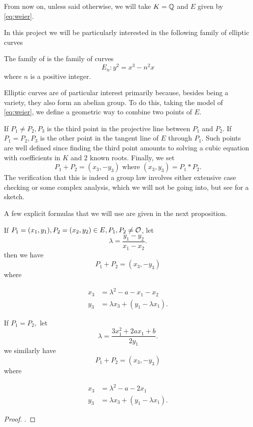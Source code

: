 \documentclass[12pt, a4paper]{amsart}
\begin{document}
From now on, unless said otherwise, we will take $K = {\mathbb Q}$ and $E$ given
by \autoref{eq:weier}.

In this project we will be particularly interested in the following family
of elliptic curves

\begin{defn}
  The family of  is the family of curves
  \begin{equation} \label{eq:twist}
    E_n : y^2 = x^3 - n^2 x
  \end{equation}
  where $n$ is a positive integer.
\end{defn}

Elliptic curves are of particular interest primarily because, besides being
a variety, they also form an abelian group. To do this, taking the model of
\autoref{eq:weier}, we define a geometric way to combine two points of $E$.

If $P_1 \neq P_2, P_3$ is the third point in the projective line between $P_1$
and $P_2$. If $P_1 = P_2, P_3$ is the other point in the tangent line of $E$
through $P_1$.
Such points are well defined since finding the third point amounts to solving
a cubic equation with coefficients in $K$ and 2 known roots.
Finally, we set
\[P_1 + P_2 = (x_3, -y_3) \text{ where } (x_3,y_3) = P_1 * P_2.\]
The verification that this is indeed a  group law involves either
extensive case checking or
some complex analysis, which we will not be going into, but see
\cite[129-137]{Granville} for a sketch.

A few explicit formulas that we will use are given in the next proposition. 

\begin{prop}
  If $P_1 = (x_1,y_1), P_2 = (x_2,y_2) \in E, P_1, P_2 \neq {\mathcal O}$, let
  $$\lambda = \frac{y_1-y_2}{x_1-x_2}.$$
  then we have
  \[P_1 + P_2 = (x_3,-y_3)\]
  where

  \begin{equation} \label{eq:adddiff}
    \begin{split}
      x_3 &= \lambda^2 - a - x_1 - x_2 \\
      y_3 &= \lambda x_3 + (y_1 - \lambda x_1).
    \end{split}
  \end{equation}

  If $P_1 = P_2,$ let
  \[\lambda = \frac{3x_1^2 + 2ax_1 + b}{2y_1}.\]
  we similarly have
  \[P_1 + P_2 = (x_3,-y_3)\]
  where
  
  \begin{equation} \label {eq:addsim}
    \begin{split}
      x_3 &= \lambda^2 - a - 2x_1 \\
      y_3 &= \lambda x_3 + (y_1 - \lambda x_1).
    \end{split}
  \end{equation}
\end{prop}
\begin{proof}
  \cite[See][Chapter 1.7, page 34]{modular}.
\end{proof}
\end{document}
